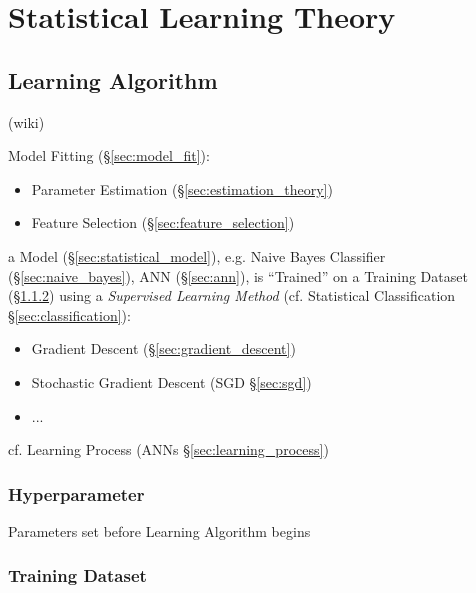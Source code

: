 \section{Statistical Learning Theory}\label{sec:statistical_learning_theory}

\subsection{Learning Algorithm}\label{sec:learning_algorithm}

(wiki)

Model Fitting (\S\ref{sec:model_fit}):
\begin{itemize}
  \item Parameter Estimation (\S\ref{sec:estimation_theory})
  \item Feature Selection (\S\ref{sec:feature_selection})
\end{itemize}

a Model (\S\ref{sec:statistical_model}), e.g. Naive Bayes Classifier
(\S\ref{sec:naive_bayes}), ANN (\S\ref{sec:ann}), is ``Trained'' on a Training
Dataset (\S\ref{sec:training_dataset}) using a \emph{Supervised Learning Method}
(cf. Statistical Classification \S\ref{sec:classification}):
\begin{itemize}
  \item Gradient Descent (\S\ref{sec:gradient_descent})
  \item Stochastic Gradient Descent (SGD \S\ref{sec:sgd})
  \item ...
\end{itemize}

\fist cf. Learning Process (ANNs \S\ref{sec:learning_process})



\subsubsection{Hyperparameter}\label{sec:hyperparameter}

Parameters set before Learning Algorithm begins



\subsubsection{Training Dataset}\label{sec:training_dataset}

